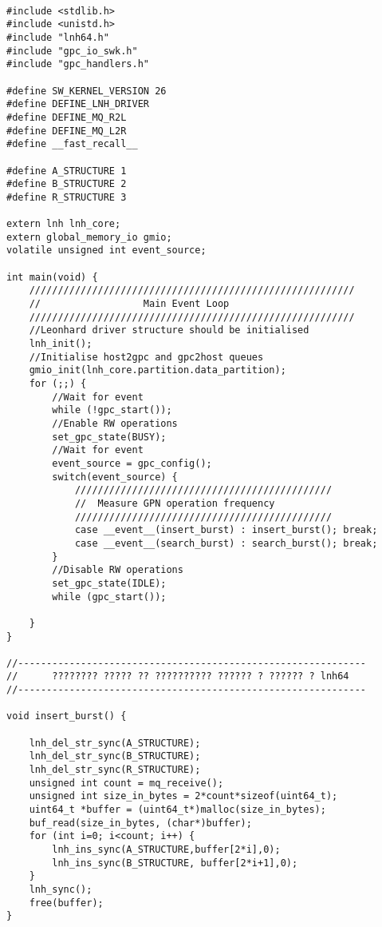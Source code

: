 \begin{lstlisting}[caption={Код программы по индивидуальному варианту sw\_kernel\_main.c}, label=lst2, style=Go]

#include <stdlib.h>
#include <unistd.h>
#include "lnh64.h"
#include "gpc_io_swk.h"
#include "gpc_handlers.h"

#define SW_KERNEL_VERSION 26
#define DEFINE_LNH_DRIVER
#define DEFINE_MQ_R2L
#define DEFINE_MQ_L2R
#define __fast_recall__

#define A_STRUCTURE 1
#define B_STRUCTURE 2
#define R_STRUCTURE 3

extern lnh lnh_core;
extern global_memory_io gmio;
volatile unsigned int event_source;

int main(void) {
    /////////////////////////////////////////////////////////
    //                  Main Event Loop
    /////////////////////////////////////////////////////////
    //Leonhard driver structure should be initialised
    lnh_init();
    //Initialise host2gpc and gpc2host queues
    gmio_init(lnh_core.partition.data_partition);
    for (;;) {
        //Wait for event
        while (!gpc_start());
        //Enable RW operations
        set_gpc_state(BUSY);
        //Wait for event
        event_source = gpc_config();
        switch(event_source) {
            /////////////////////////////////////////////
            //  Measure GPN operation frequency
            /////////////////////////////////////////////
            case __event__(insert_burst) : insert_burst(); break;
            case __event__(search_burst) : search_burst(); break;
        }
        //Disable RW operations
        set_gpc_state(IDLE);
        while (gpc_start());

    }
}

//-------------------------------------------------------------
//      ???????? ????? ?? ?????????? ?????? ? ?????? ? lnh64
//-------------------------------------------------------------
 
void insert_burst() {

    lnh_del_str_sync(A_STRUCTURE);
    lnh_del_str_sync(B_STRUCTURE);
    lnh_del_str_sync(R_STRUCTURE);
    unsigned int count = mq_receive();
    unsigned int size_in_bytes = 2*count*sizeof(uint64_t);
    uint64_t *buffer = (uint64_t*)malloc(size_in_bytes);
    buf_read(size_in_bytes, (char*)buffer);
    for (int i=0; i<count; i++) {
        lnh_ins_sync(A_STRUCTURE,buffer[2*i],0);
        lnh_ins_sync(B_STRUCTURE, buffer[2*i+1],0);
    }
    lnh_sync();
    free(buffer);
}



\end{lstlisting}
